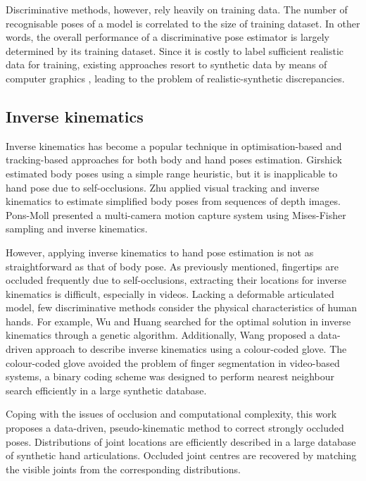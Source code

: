 Discriminative methods, however, rely heavily on training data. The number of recognisable poses of a model is correlated to the size of training dataset. In other words, the overall performance of a discriminative pose estimator is largely determined by its training dataset. 
Since it is costly to label sufficient realistic data for training, existing approaches resort to synthetic data by means of computer graphics \cite{Romero2009, Keskin2012}, leading to the problem of realistic-synthetic discrepancies.

\subsection{Inverse kinematics}   
Inverse kinematics has become a popular technique in optimisation-based and tracking-based  approaches for both body and hand poses estimation. 
Girshick \etal \cite{Girshick2011} estimated body poses using a simple range heuristic, but it is inapplicable to hand pose due to self-occlusions. 
Zhu \etal \cite{Zhu2008a} applied visual tracking and inverse kinematics to estimate simplified body poses from sequences of depth images.
Pons-Moll \etal \cite{Pons-Moll2011} presented a multi-camera motion capture system using Mises-Fisher sampling and inverse kinematics.  

However, applying inverse kinematics to hand pose estimation is not as straightforward as that of body pose. As previously mentioned, fingertips are occluded frequently due to self-occlusions, extracting their locations for inverse kinematics is difficult, especially in videos. 
Lacking a deformable articulated model, few discriminative methods consider the physical characteristics of human hands. For example, Wu and Huang \cite{Wu1999} searched for the optimal solution in inverse kinematics through a genetic algorithm. Additionally, Wang \etal \cite{Wang2009} proposed a data-driven approach to describe inverse kinematics using a colour-coded glove. The colour-coded glove avoided the problem of finger segmentation in video-based systems, a binary coding scheme was designed to perform nearest neighbour search efficiently in a large synthetic database. 

Coping with the issues of occlusion and computational complexity, this work proposes a data-driven, pseudo-kinematic method to correct strongly occluded poses. Distributions of joint locations are efficiently described in a large database of synthetic hand articulations. Occluded joint centres are recovered by matching the visible joints from the corresponding distributions.

